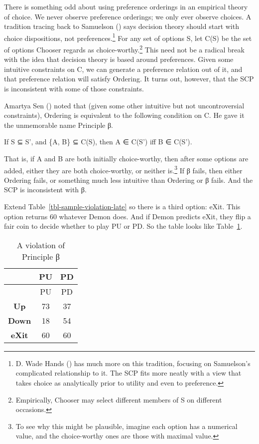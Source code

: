 \documentclass[
  10pt,
  letterpaper,
  DIV=11,
  numbers=noendperiod,
  twoside]{scrartcl}
\providecommand{\tightlist}{%
  \setlength{\itemsep}{0pt}\setlength{\parskip}{0pt}}\usepackage{longtable,booktabs,array}
\begin{document}
There is something odd about using preference orderings in an empirical
theory of choice. We never observe preference orderings; we only ever
observe choices. A tradition tracing back to Samuelson
() says decision theory should start
with choice dispositions, not preferences.\footnote{D. Wade Hands
  () has much more on this tradition,
  focusing on Samuelson's complicated relationship to it. The SCP fits
  more neatly with a view that takes choice as analytically prior to
  utility and even to preference.} For any set of options S, let C(S) be
the set of options Chooser regards as choice-worthy.\footnote{Empirically,
  Chooser may select different members of S on different occasions.}
This need not be a radical break with the idea that decision theory is
based around preferences. Given some intuitive constraints on C, we can
generate a preference relation out of it, and that preference relation
will satisfy Ordering. It turns out, however, that the SCP is
inconsistent with some of those constraints.

Amartya Sen () noted that (given some other
intuitive but not uncontroversial constraints), Ordering is equivalent
to the following condition on C. He gave it the unmemorable name
Principle β.

\begin{description}
\tightlist
\item[β]
If S ⊆ S', and \{A, B\} ⊆ C(S), then A ∈ C(S') iff B ∈ C(S').
\end{description}

That is, if A and B are both initially choice-worthy, then after some
options are added, either they are both choice-worthy, or neither
is.\footnote{To see why this might be plausible, imagine each option has
  a numerical value, and the choice-worthy ones are those with maximal
  value.} If β fails, then either Ordering fails, or something much less
intuitive than Ordering or β fails. And the SCP is inconsistent with β.

Extend Table~\ref{tbl-sample-violation-late} so there is a third option:
eXit. This option returns 60 whatever Demon does. And if Demon predicts
eXit, they flip a fair coin to decide whether to play PU or PD. So the
table looks like Table~\ref{tbl-beta-violation}.

\begin{longtable}[]{@{}ccc@{}}
\caption{A violation of Principle
β}\label{tbl-beta-violation}\tabularnewline
\toprule\noalign{}
& PU & PD \\
\midrule\noalign{}
\endfirsthead
\toprule\noalign{}
& PU & PD \\
\midrule\noalign{}
\endhead
\bottomrule\noalign{}
\endlastfoot
\textbf{Up} & 73 & 37 \\
\textbf{Down} & 18 & 54 \\
\textbf{eXit} & 60 & 60 \\
\end{longtable}
\end{document}
